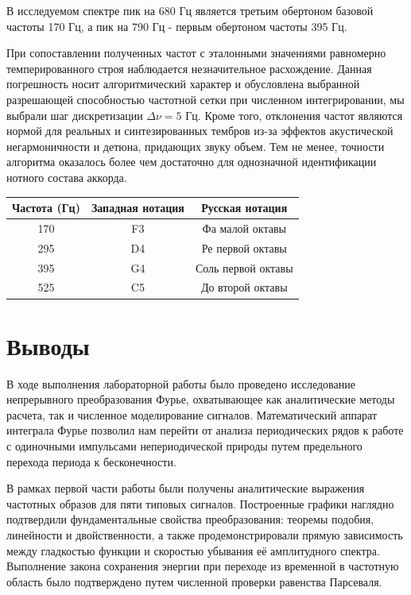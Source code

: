 \documentclass[a4paper,14pt]{extarticle}
\begin{document}
В исследуемом спектре пик на 680 Гц является третьим обертоном 
базовой частоты 170 Гц, 
а пик на 790 Гц - первым обертоном частоты 395 Гц. 

При сопоставлении полученных частот с эталонными значениями равномерно 
темперированного строя наблюдается незначительное расхождение. 
Данная погрешность носит алгоритмический характер и обусловлена выбранной разрешающей 
способностью частотной сетки при численном интегрировании, мы выбрали шаг дискретизации $\Delta\nu = 5$ Гц. Кроме того, отклонения частот являются 
нормой для реальных и синтезированных тембров из-за эффектов акустической негармоничности 
и детюна, придающих звуку объем. Тем не менее, точности алгоритма оказалось 
более чем достаточно для однозначной идентификации нотного состава аккорда.

\begin{center}
\begin{tabular}{|c|c|c|}
    \hline
    \textbf{Частота (Гц)} & \textbf{Западная нотация} & \textbf{Русская нотация} \\
    \hline
    170 & F3 & Фа малой октавы \\
    \hline
    295 & D4 & Ре первой октавы \\
    \hline
    395 & G4 & Соль первой октавы \\
    \hline
    525 & C5 & До второй октавы \\
    \hline
\end{tabular}
\end{center}

\newpage

\section{Выводы}

В ходе выполнения лабораторной работы было проведено исследование 
непрерывного преобразования Фурье, охватывающее как аналитические методы расчета, 
так и численное моделирование сигналов. Математический аппарат интеграла Фурье позволил 
нам перейти от анализа периодических рядов к работе с одиночными импульсами непериодической 
природы путем предельного перехода периода к бесконечности.

В рамках первой части работы были получены аналитические выражения частотных 
образов для пяти типовых сигналов. Построенные графики наглядно подтвердили 
фундаментальные свойства преобразования: теоремы подобия, линейности и 
двойственности, а также продемонстрировали прямую зависимость между гладкостью 
функции и скоростью убывания её амплитудного спектра. Выполнение закона сохранения 
энергии при переходе из временной в частотную область было подтверждено 
путем численной проверки равенства Парсеваля.
\end{document}
